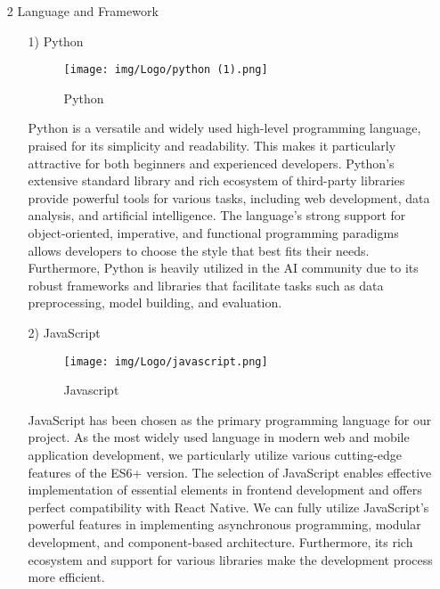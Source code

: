 \documentclass[conference]{IEEEtran}
\begin{document}
\begin{enumerate}
    \item[2] Language and Framework\par
    \vspace{0.3em}
    
    \begin{itemize}
        \item [1)] Python\par
        \vspace{0.3em}
        \begin{figure}[h]
        \centering
        \texttt{[image: img/Logo/python (1).png]}
        \centering
        \caption{Python} 
        \end{figure}\par
        \vspace{0.3em}
        Python is a versatile and widely used high-level programming language, praised for its simplicity and readability. This makes it particularly attractive for both beginners and experienced developers. Python’s extensive standard library and rich ecosystem of third-party libraries provide powerful tools for various tasks, including web development, data analysis, and artificial intelligence. The language’s strong support for object-oriented, imperative, and functional programming paradigms allows developers to choose the style that best fits their needs. Furthermore, Python is heavily utilized in the AI community due to its robust frameworks and libraries that facilitate tasks such as data preprocessing, model building, and evaluation. \\
        
        \vspace{1em}
        
        \item [2)] JavaScript\par
        \vspace{0.3em}
        \begin{figure}[h]
        \centering
        \texttt{[image: img/Logo/javascript.png]}
        \centering
        \caption{Javascript} 
        \end{figure}\par
        \vspace{0.3em}
        JavaScript has been chosen as the primary programming language for our project. As the most widely used language in modern web and mobile application development, we particularly utilize various cutting-edge features of the ES6+ version. The selection of JavaScript enables effective implementation of essential elements in frontend development and offers perfect compatibility with React Native. We can fully utilize JavaScript's powerful features in implementing asynchronous programming, modular development, and component-based architecture. Furthermore, its rich ecosystem and support for various libraries make the development process more efficient.
        

\end{itemize}
\end{enumerate}
\end{document}
